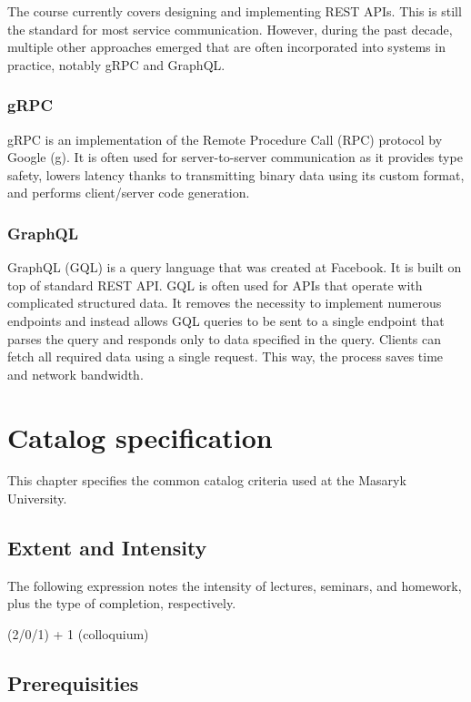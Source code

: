 \documentclass[
  digital,
  color,
  oneside,
  nosansbold,
  nocolorbold,
  lof,
  lot,
]{fithesis4}
\begin{document}
The course currently covers designing and implementing REST APIs. This is still the standard for most service communication. However, during the past decade, multiple other approaches emerged that are often incorporated into systems in practice, notably gRPC and GraphQL.

\subsubsection{gRPC}

gRPC is an implementation of the Remote Procedure Call (RPC) protocol by Google (g). It is often used for server-to-server communication as it provides type safety, lowers latency thanks to transmitting binary data using its custom format, and performs client/server code generation.

\subsubsection{GraphQL}

GraphQL (GQL) is a query language that was created at Facebook. It is built on top of standard REST API. GQL is often used for APIs that operate with complicated structured data. It removes the necessity to implement numerous endpoints and instead allows GQL queries to be sent to a single endpoint that parses the query and responds only to data specified in the query. Clients can fetch all required data using a single request. This way, the process saves time and network bandwidth.

\section{Catalog specification}

This chapter specifies the common catalog criteria used at the Masaryk University.

\subsection{Extent and Intensity}

The following expression notes the intensity of lectures, seminars, and homework, plus the type of completion, respectively.

(2/0/1) + 1 (colloquium)

\subsection{Prerequisities}
\end{document}

